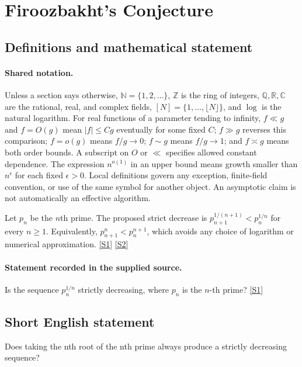 \documentclass[11pt,a4paper]{article}
\newcommand{\N}{\mathbb{N}}
\newcommand{\Z}{\mathbb{Z}}
\newcommand{\Q}{\mathbb{Q}}
\newcommand{\R}{\mathbb{R}}
\newcommand{\C}{\mathbb{C}}
\newcommand{\sref}[2]{\hyperlink{source:#1:#2}{[S#2]}}
\begin{document}
\section{Firoozbakht's Conjecture}\label{statement}


\subsection{Definitions and mathematical statement}

\paragraph{Shared notation.}Unless a section says otherwise, $\N=\{1,2,\ldots\}$,
$\Z$ is the ring of integers, $\Q,\R,\C$ are the rational, real, and complex
fields, $[N]=\{1,\ldots,\lfloor N\rfloor\}$, and $\log$ is the natural
logarithm. For real functions of a parameter tending to infinity,
$f\ll g$ and $f=O(g)$ mean $|f|\leq Cg$ eventually for some fixed $C$;
$f\gg g$ reverses this comparison; $f=o(g)$ means $f/g\to0$;
$f\sim g$ means $f/g\to1$; and $f\asymp g$ means both order bounds.
A subscript on $O$ or $\ll$ specifies allowed constant dependence.
The expression $n^{o(1)}$ in an upper bound means growth smaller than
$n^\epsilon$ for each fixed $\epsilon>0$. Local definitions govern any
exception, finite-field convention, or use of the same symbol for another
object. An asymptotic claim is not automatically an effective algorithm.



Let $p_n$ be the $n$th prime. The proposed strict decrease is $p_{n+1}^{1/(n+1)}<p_n^{1/n}$ for every $n\geq1$. Equivalently, $p_{n+1}^n<p_n^{n+1}$, which avoids any choice of logarithm or numerical approximation. \sref{statement}{1} \sref{statement}{2}

\paragraph{Statement recorded in the supplied source.}
Is the sequence $p_n^{1/n}$ strictly decreasing, where $p_n$ is the $n$-th prime? \sref{statement}{1}

\subsection{Short English statement}

Does taking the nth root of the nth prime always produce a strictly decreasing sequence?
\end{document}
